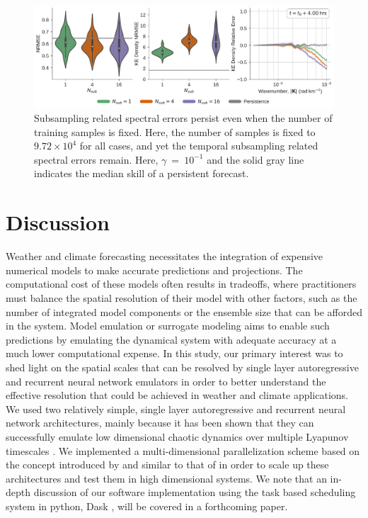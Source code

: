\documentclass[draft]{agujournal2019}
\newcommand{\citep}{\cite}
\newcommand{\citet}{\citeA}
\begin{document}
\begin{figure}
    \centering
    \includegraphics[width=\textwidth]{figures/rc_fixed_steps.pdf}
    \caption{Subsampling related spectral errors persist even when the number of
        training samples is fixed. Here, the number of samples is fixed to
        $9.72\times10^{4}$ for all cases, and yet the temporal subsampling
        related spectral errors remain.
        Here, $\gamma$~=~$10^{-1}$ and the solid gray line indicates the median skill of a persistent
        forecast.
    }
    \label{fig:esn-fixed-steps}
\end{figure}

\section{Discussion}
\label{sec:discussion}

Weather and climate forecasting necessitates the integration of expensive
numerical models to make accurate predictions and projections.
The computational cost of these models often results in tradeoffs, where
practitioners must balance the spatial resolution of their model with other
factors, such as the number of integrated model components or the ensemble
size that can be afforded in the system.
Model emulation or surrogate modeling aims to enable such predictions
by emulating the dynamical system with adequate accuracy at a much lower
computational expense.
In this study, our primary interest was to shed light on the spatial scales
that can be resolved by single layer autoregressive and recurrent
neural network emulators in order to better
understand the effective resolution that could be achieved in weather and
climate applications.
We used two relatively simple, single layer autoregressive and recurrent neural
network architectures, mainly because it has been shown that they can
successfully emulate low dimensional chaotic dynamics over multiple Lyapunov
timescales
\citep{pathak_using_2017,vlachas_backpropagation_2020,gauthier_next_2021,platt_systematic_2022}.
We implemented a multi-dimensional parallelization scheme based on the concept
introduced by \citet{pathak_model-free_2018} and similar to that of
\citet{arcomano_machine_2020}
in order to scale up these architectures and test them in high dimensional
systems.
We note that an in-depth discussion of our software implementation using the
task based scheduling system in python, Dask \citep{dask_2016}, will be covered in a
forthcoming paper.
\end{document}
